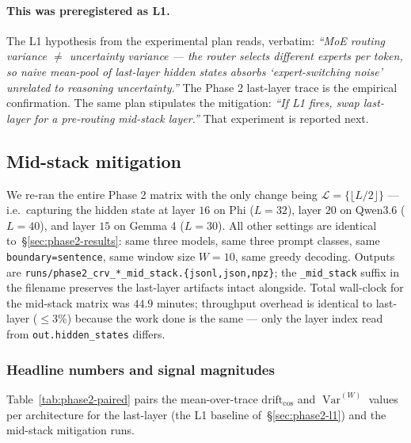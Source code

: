 \documentclass[11pt,letterpaper]{article}
\newcommand{\drift}{\mathrm{drift}_{\cos}}
\newcommand{\Var}{\operatorname{Var}}
\begin{document}
\paragraph{This was preregistered as L1.}
The L1 hypothesis from the experimental plan reads, verbatim:
\emph{``MoE routing variance $\neq$ uncertainty variance --- the router
selects different experts per token, so naive mean-pool of last-layer
hidden states absorbs `expert-switching noise' unrelated to reasoning
uncertainty.''} The Phase 2 last-layer trace is the empirical
confirmation. The same plan stipulates the mitigation: \emph{``If L1
fires, swap last-layer for a pre-routing mid-stack layer.''} That
experiment is reported next.

\subsection{Mid-stack mitigation}
\label{sec:phase2-mid}

We re-ran the entire Phase 2 matrix with the only change being
$\mathcal{L} = \{\lfloor L/2 \rfloor\}$ — i.e.~capturing the hidden
state at layer $16$ on Phi ($L = 32$), layer $20$ on Qwen3.6 ($L = 40$),
and layer $15$ on Gemma 4 ($L = 30$). All other settings are identical
to~\S\ref{sec:phase2-results}: same three models, same three prompt
classes, same \texttt{boundary=sentence}, same window size $W = 10$,
same greedy decoding. Outputs are
\verb|runs/phase2_crv_*_mid_stack.{jsonl,json,npz}|; the
\texttt{\_mid\_stack} suffix in the filename preserves the last-layer
artifacts intact alongside. Total wall-clock for the mid-stack matrix
was $44.9$ minutes; throughput overhead is identical to last-layer
($\le 3\%$) because the work done is the same — only the layer index
read from \verb|out.hidden_states| differs.

\subsubsection{Headline numbers and signal magnitudes}

Table~\ref{tab:phase2-paired} pairs the mean-over-trace $\drift$ and
$\Var^{(W)}$ values per architecture for the last-layer (the L1 baseline
of~\S\ref{sec:phase2-l1}) and the mid-stack mitigation runs.
\end{document}
